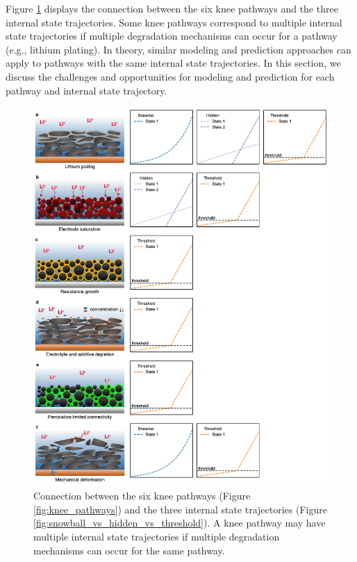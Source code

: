 \documentclass[journal=jpclcd,manuscript=article]{achemso}
\begin{document}
Figure \ref{fig:summary} displays the connection between the six knee pathways and the three internal state trajectories. Some knee pathways correspond to multiple internal state trajectories if multiple degradation mechanisms can occur for a pathway (e.g., lithium plating). In theory, similar modeling and prediction approaches can apply to pathways with the same internal state trajectories. In this section, we discuss the challenges and opportunities for modeling and prediction for each pathway and internal state trajectory.

\begin{figure}[p]
    \centering
    \includegraphics[scale=0.85]{final_figures/pathway_trajectory_summary.pdf}
    \caption{
    Connection between the six knee pathways (Figure \ref{fig:knee_pathways}) and the three internal state trajectories (Figure \ref{fig:snowball_vs_hidden_vs_threshold}).
    A knee pathway may have multiple internal state trajectories if multiple degradation mechanisms can occur for the same pathway.
    }
    \label{fig:summary}
\end{figure}
\end{document}
